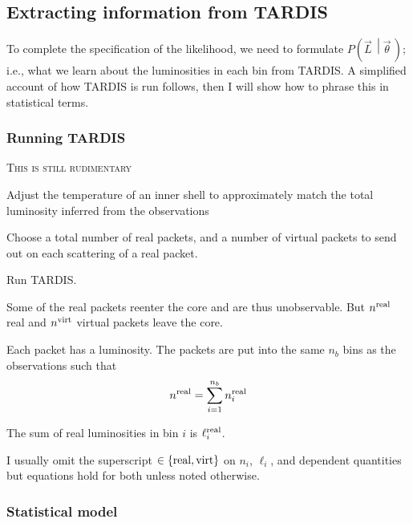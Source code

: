 \documentclass[a4,12pt]{article}
\newcommand{\given}[2]{\left(#1\, \middle| #2 \, \right)}
\newcommand{\lumi}{\ensuremath{\ell_i}}
\newcommand{\real}{\ensuremath{{\rm real}}}
\newcommand{\virt}{\ensuremath{{\rm virt}}}
\newcommand{\vecL}{\ensuremath{\vec{L}}}
\newcommand{\vecth}{\ensuremath{{\vec{\theta}}}}
\newcommand{\todo}[1]{{\textsc{\color{red}#1}}}
\newcommand{\tardis}{TARDIS}
\begin{document}
\subsection{Extracting information from \tardis}

To complete the specification of the likelihood, we need to formulate
$P\given{\vecL}{\vecth}$; i.e., what we learn about the luminosities
in each bin from \tardis. A simplified account of how \tardis{} is run
follows, then I will show how to phrase this in statistical terms.

\subsubsection{Running \tardis}
\todo{This is still rudimentary}
\begin{compactenum}[(I)]
  \item Adjust the temperature of an inner shell to approximately match
    the total luminosity inferred from the observations
  \item Choose a total number of real packets, and a number of virtual
    packets to send out on each scattering of a real packet.
  \item Run \tardis.
  \item Some of the real packets reenter the core and are thus
    unobservable. But $n^\real$ real and $n^\virt$ virtual packets
    leave the core.
  \item Each packet has a luminosity. The packets are put into the
    same $n_b$ bins as the observations such that
    \begin{align}
      \label{eq:bin-packets}
      n^\real = \sum_{i=1}^{n_b} n_i^\real
    \end{align}
  \item The sum of real luminosities in bin $i$ is $\lumi^\real$.
\end{compactenum}
I usually omit the superscript $\in \{\real, \virt\}$ on $n_i$,
$\lumi$, and dependent quantities but equations hold for both unless
noted otherwise.

\subsubsection{Statistical model}
\end{document}
